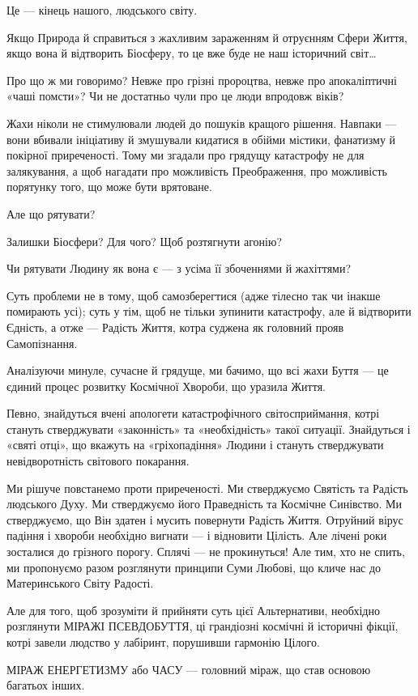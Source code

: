 Це — кінець нашого, людського світу.

Якщо Природа й справиться з жахливим зараженням й отруєнням Сфери Життя, якщо
вона й відтворить Біосферу, то це вже буде не наш історичний світ…

Про що ж ми говоримо? Невже про грізні пророцтва, невже про апокаліптичні «чаші
помсти»? Чи не достатньо чули про це люди впродовж віків?

Жахи ніколи не стимулювали людей до пошуків кращого рішення. Навпаки — вони
вбивали ініціативу й змушували кидатися в обійми містики, фанатизму й покірної
приреченості. Тому ми згадали про грядущу катастрофу не для залякування, а щоб
нагадати про можливість Преображення, про можливість порятунку того, що може
бути врятоване.

Але що рятувати?

Залишки Біосфери? Для чого? Щоб розтягнути агонію?

Чи рятувати Людину як вона є — з усіма її збоченнями й жахіттями?

Суть проблеми не в тому, щоб самозберегтися (адже тілесно так чи інакше
помирають усі); суть у тім, щоб не тільки зупинити катастрофу, але й відтворити
Єдність, а отже — Радість Життя, котра суджена як головний прояв Самопізнання.

Аналізуючи минуле, сучасне й грядуще, ми бачимо, що всі жахи Буття — це єдиний
процес розвитку Космічної Хвороби, що уразила Життя.

Певно, знайдуться вчені апологети катастрофічного світосприймання, котрі
стануть стверджувати «законність» та «необхідність» такої ситуації. Знайдуться
і «святі отці», що вкажуть на «гріхопадіння» Людини і стануть стверджувати
невідворотність світового покарання.

Ми рішуче повстанемо проти приреченості. Ми стверджуємо Святість та Радість
людського Духу. Ми стверджуємо його Праведність та Космічне Синівство. Ми
стверджуємо, що Він здатен і мусить повернути Радість Життя. Отруйний вірус
падіння і хвороби необхідно вигнати — і відновити Цілість. Але лічені роки
зосталися до грізного порогу. Сплячі — не прокинуться! Але тим, хто не спить,
ми пропонуємо разом розглянути принципи Суми Любові, що кличе нас до
Материнського Світу Радості.

Але для того, щоб зрозуміти й прийняти суть цієї Альтернативи, необхідно
розглянути МІРАЖІ ПСЕВДОБУТТЯ, ці грандіозні космічні й історичні фікції, котрі
завели людство у лабіринт, порушивши гармонію Цілого.

МІРАЖ ЕНЕРГЕТИЗМУ або ЧАСУ — головний міраж, що став основою багатьох інших.

